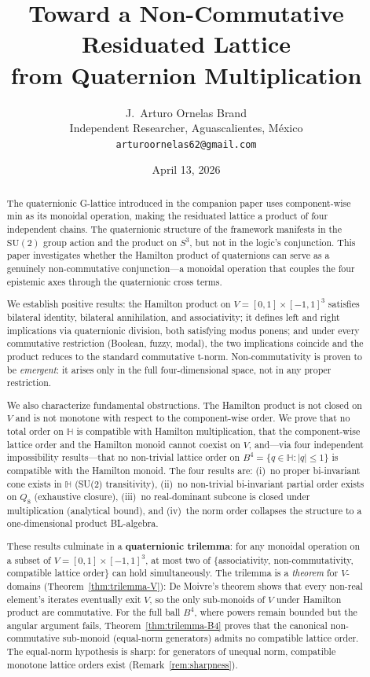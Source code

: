 \documentclass[11pt,a4paper]{article}
\title{Toward a Non-Commutative Residuated Lattice\\
from Quaternion Multiplication}
\author{J.~Arturo Ornelas Brand\\
\small Independent Researcher, Aguascalientes, M\'exico\\
\small \texttt{arturoornelas62@gmail.com}}
\date{April 13, 2026}
\newcommand{\SU}{\mathrm{SU}(2)}
\newcommand{\Hq}{\mathbb{H}}
\begin{document}
\maketitle

\begin{abstract}
The quaternionic G-lattice introduced in the companion paper uses
component-wise min as its monoidal operation, making the residuated
lattice a product of four independent chains. The quaternionic structure
of the framework manifests in the $\SU$ group action and the product on
$S^3$, but not in the logic's conjunction. This paper investigates
whether the Hamilton product of quaternions can serve as a genuinely
non-commutative conjunction---a monoidal operation that couples the four
epistemic axes through the quaternionic cross terms.

We establish positive results: the Hamilton product on
$V = [0,1] \times [-1,1]^3$ satisfies bilateral identity, bilateral
annihilation, and associativity; it defines left and right implications
via quaternionic division, both satisfying modus ponens; and under every
commutative restriction (Boolean, fuzzy, modal), the two implications
coincide and the product reduces to the standard commutative t-norm.
Non-commutativity is proven to be \emph{emergent}: it arises only in the
full four-dimensional space, not in any proper restriction.

We also characterize fundamental obstructions. The Hamilton product
is not closed on $V$ and is not monotone with respect to the
component-wise order. We prove that no total order on $\Hq$ is
compatible with Hamilton multiplication, that the component-wise
lattice order and the Hamilton monoid cannot coexist on $V$, and---via
four independent impossibility results---that no non-trivial lattice
order on $B^4 = \{q \in \Hq : |q| \leq 1\}$ is compatible with the
Hamilton monoid. The four results are: (i)~no proper bi-invariant cone
exists in $\Hq$ (SU(2) transitivity), (ii)~no non-trivial
bi-invariant partial order exists on $Q_8$ (exhaustive closure),
(iii)~no real-dominant subcone is closed under multiplication
(analytical bound), and (iv)~the norm order collapses the structure to
a one-dimensional product BL-algebra.

These results culminate in a \textbf{quaternionic trilemma}: for any
monoidal operation on a subset of $V = [0,1] \times [-1,1]^3$, at
most two of \{associativity, non-commutativity, compatible lattice
order\} can hold simultaneously. The trilemma is a \emph{theorem}
for $V$-domains (Theorem~\ref{thm:trilemma-V}): De Moivre's theorem
shows that every non-real element's iterates eventually exit $V$, so
the only sub-monoids of $V$ under Hamilton product are commutative.
For the full ball $B^4$, where powers remain bounded but the
angular argument fails, Theorem~\ref{thm:trilemma-B4} proves that
the canonical non-commutative sub-monoid (equal-norm generators)
admits no compatible lattice order. The equal-norm hypothesis is
sharp: for generators of unequal norm, compatible monotone lattice
orders exist (Remark~\ref{rem:sharpness}).


\end{abstract}
\end{document}
